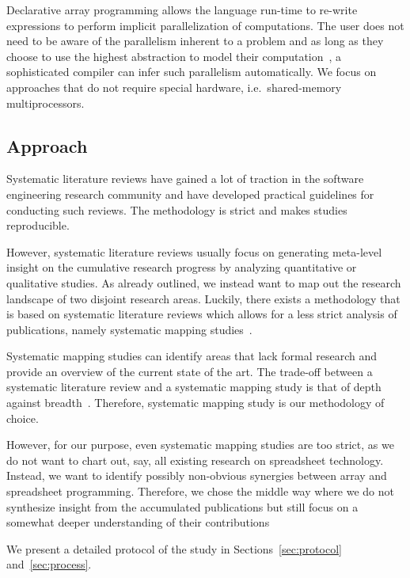 \documentclass[a4paper]{article}
\begin{document}
Declarative array programming allows the language run-time to re-write expressions to perform implicit parallelization of computations. The user does not need to be aware of the parallelism inherent to a problem and as long as they choose to use the highest abstraction to model their computation~\cite{Bernecky:2015:AEP:2774959.2774962}, a sophisticated compiler can infer such parallelism automatically. We focus on approaches that do not require special hardware, i.e.\ shared-memory multiprocessors.

\subsection{Approach}
\label{sec:approach}

Systematic literature reviews have gained a lot of traction in the software engineering research community and \citet{keele2007guidelines} have developed practical guidelines for conducting such reviews. The methodology is strict and makes studies reproducible.

However, systematic literature reviews usually focus on generating meta-level insight on the cumulative research progress by analyzing quantitative or qualitative studies. As already outlined, we instead want to map out the research landscape of two disjoint research areas. Luckily, there exists a methodology that is based on systematic literature reviews which allows for a less strict analysis of publications, namely systematic mapping studies~\cite{petersen2008systematic}.

Systematic mapping studies can identify areas that lack formal research and provide an overview of the current state of the art. The trade-off between a systematic literature review and a systematic mapping study is that of depth against breadth~\cite{keele2007guidelines, petersen2008systematic}. Therefore,
systematic mapping study is our methodology of choice.

However, for our purpose, even systematic mapping studies are too strict, as we do not want to chart out, say, all existing research on spreadsheet technology. Instead, we want to identify possibly non-obvious synergies between array and spreadsheet programming. Therefore, we chose the middle way where we do not synthesize insight from the accumulated publications but still focus on a somewhat deeper understanding of their contributions

We present a detailed protocol of the study in Sections~\ref{sec:protocol} and~\ref{sec:process}.
\end{document}
